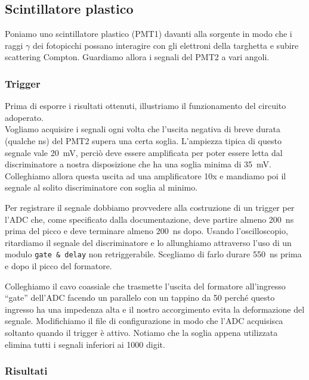 
\subsection{Scintillatore plastico}

Poniamo uno scintillatore plastico (PMT1) davanti alla sorgente in modo che i raggi $\gamma$ dei fotopicchi possano interagire con gli elettroni della targhetta e subire scattering Compton. Guardiamo allora i segnali del PMT2 a vari angoli.


\subsubsection{Trigger}

Prima di esporre i risultati ottenuti, illustriamo il funzionamento del circuito adoperato.\\
Vogliamo acquisire i segnali ogni volta che l'uscita negativa di breve durata (qualche \si{ns}) del PMT2 supera una certa soglia. L'ampiezza tipica di questo segnale vale \SI{20}{mV}, perciò deve essere amplificata per poter essere letta dal discriminatore a nostra disposizione che ha una soglia minima di \SI{35}{mV}. Colleghiamo allora questa uscita ad una amplificatore 10x 
e mandiamo poi il segnale al solito discriminatore con soglia al minimo.

Per registrare il segnale dobbiamo provvedere alla costruzione di un trigger per l'ADC che, come specificato dalla documentazione, deve partire almeno \SI{200}{ns} prima del picco e deve terminare almeno \SI{200}{ns} dopo. Usando l'oscilloscopio, ritardiamo il segnale del discriminatore e lo allunghiamo attraverso l'uso di un modulo \texttt{gate \& delay} non retriggerabile. Scegliamo di farlo durare \SI{550}{ns} prima e dopo il picco del formatore.

Colleghiamo il cavo coassiale che trasmette l'uscita del formatore all'ingresso ``gate'' dell'ADC facendo un parallelo con un tappino da \SI{50}{\Omega} perché questo ingresso ha una impedenza alta e il nostro accorgimento evita la deformazione del segnale.
Modifichiamo il file di configurazione in modo che l'ADC acquisisca soltanto quando il trigger è attivo. Notiamo che la soglia appena utilizzata elimina tutti i segnali inferiori ai 1000 digit. 

\subsubsection{Risultati} %

